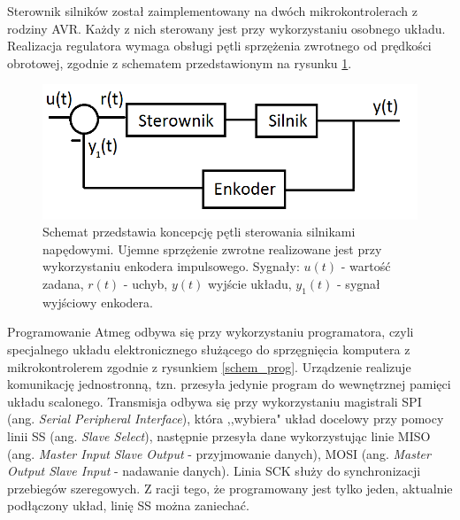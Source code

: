 Sterownik silników został zaimplementowany na dwóch mikrokontrolerach z rodziny AVR. Każdy z nich sterowany jest przy wykorzystaniu osobnego układu. Realizacja regulatora wymaga obsługi pętli sprzężenia zwrotnego od prędkości obrotowej, zgodnie z schematem przedstawionym na rysunku \ref{schem_ster}. 

  \begin{figure}[H]
    \begin{center}
      \includegraphics[scale=0.45]{imgs/sterowanie.png}
 	\caption[Schemat pętli sterowania silnikami.]{\small{Schemat przedstawia koncepcję pętli sterowania silnikami napędowymi. Ujemne sprzężenie zwrotne realizowane jest przy wykorzystaniu enkodera impulsowego. Sygnały: $u(t)$ - wartość zadana, $r(t)$ - uchyb, $y(t)$ wyjście układu, $y_1(t)$ - sygnał wyjściowy enkodera.}}
	\label{schem_ster}
    \end{center}
  \end{figure}  
  
Programowanie Atmeg odbywa się przy wykorzystaniu programatora, czyli specjalnego układu elektronicznego służącego do sprzęgnięcia komputera z mikrokontrolerem zgodnie z rysunkiem \ref{schem_prog}. Urządzenie realizuje komunikację jednostronną, tzn. przesyła jedynie program do wewnętrznej pamięci układu scalonego.  Transmisja odbywa się przy wykorzystaniu magistrali SPI (ang. \textit{Serial Peripheral Interface}), która ,,wybiera" układ docelowy przy pomocy linii SS (ang. \textit{Slave Select}), następnie przesyła dane wykorzystując linie MISO (ang. \textit{Master Input Slave Output} - przyjmowanie danych), MOSI (ang. \textit{Master Output Slave Input} - nadawanie danych). Linia SCK służy do synchronizacji przebiegów szeregowych. Z racji tego, że programowany jest tylko jeden, aktualnie podłączony układ, linię SS można zaniechać.

